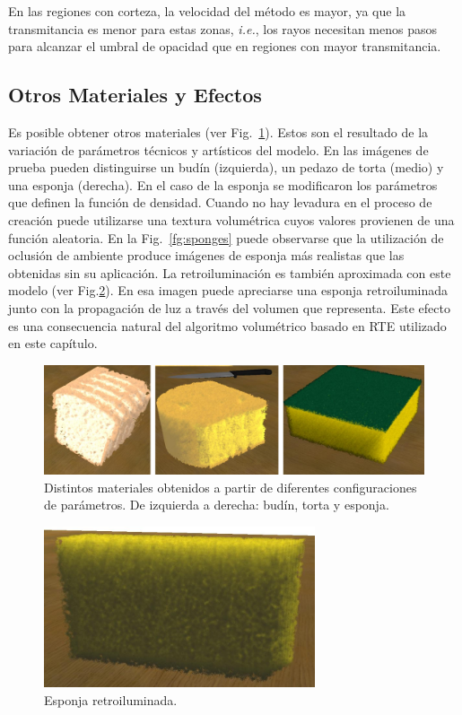En las regiones con corteza, la velocidad del método es mayor, ya que la transmitancia es menor para estas zonas, {\em i.e.}, los rayos necesitan menos pasos para alcanzar el umbral de opacidad que en regiones con mayor transmitancia.

\subsection{Otros Materiales y Efectos}
Es posible obtener otros materiales (ver Fig.~\ref{fg:fig6}).
Estos son el resultado de la variación de parámetros técnicos y artísticos del modelo.
En las imágenes de prueba pueden distinguirse un budín (izquierda), un pedazo de torta (medio) y una esponja (derecha).
En el caso de la esponja se modificaron los parámetros que definen la función de densidad.
Cuando no hay levadura en el proceso de creación puede utilizarse una textura volumétrica cuyos valores provienen de una función aleatoria.
En la Fig.~\ref{fg:sponges} puede observarse que la utilización de oclusión de ambiente produce imágenes de esponja más realistas que las obtenidas sin su aplicación.
La retroiluminación es también aproximada con este modelo (ver Fig.\ref{fg:fig7}).
En esa imagen puede apreciarse una esponja retroiluminada junto con la propagación de luz a través del volumen que representa.
Este efecto es una consecuencia natural del algoritmo volumétrico basado en RTE utilizado en este capítulo.

\begin{figure}[htb!]
  \centerline{\includegraphics[width=13cm]{fig6}}
  \caption[Budín, torta y esponja renderizados]{Distintos materiales obtenidos a partir de diferentes configuraciones de parámetros. De izquierda a derecha: budín, torta y esponja. }
  \label{fg:fig6}

\end{figure}

\begin{figure}[htb!]
  \centerline{\includegraphics[width=8cm]{fig7}}
  \caption{Esponja retroiluminada.}
  \label{fg:fig7}
\end{figure}


